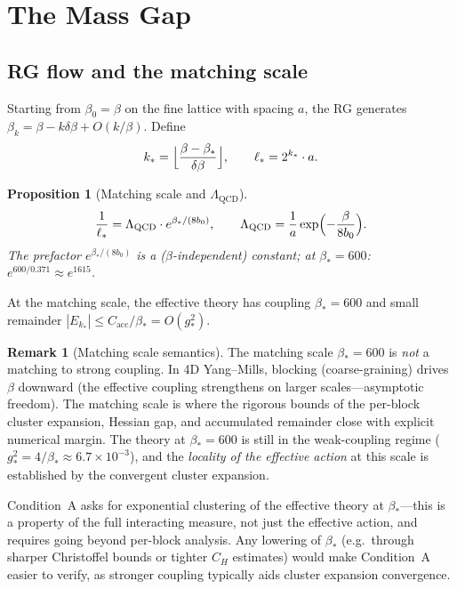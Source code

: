 \documentclass[11pt]{article}
\newtheorem{proposition}[theorem]{Proposition}
\theoremstyle{definition}
\newtheorem{remark}[theorem]{Remark}
\newcommand{\Lam}{\Lambda_{\mathrm{QCD}}}
\begin{document}
\section{The Mass Gap}\label{sec:massgap}

\subsection{RG flow and the matching scale}

Starting from $\beta_0=\beta$ on the fine lattice with spacing $a$,
the RG generates $\beta_k=\beta-k\delta\beta+O(k/\beta)$.  Define
\begin{equation}
k_*=\Bigl\lfloor\frac{\beta-\beta_*}{\delta\beta}\Bigr\rfloor,
\qquad\ell_*=2^{k_*}\cdot a.
\end{equation}

\begin{proposition}[Matching scale and $\Lam$]\label{prop:matching}
\begin{equation}\label{eq:matching}
\frac{1}{\ell_*}=\Lam\cdot e^{\beta_*/(8b_0)},
\qquad\Lam=\frac{1}{a}\exp\Bigl(-\frac{\beta}{8b_0}\Bigr).
\end{equation}
The prefactor $e^{\beta_*/(8b_0)}$ is a ($\beta$-independent)
constant; at $\beta_*=600$: $e^{600/0.371}\approx e^{1615}$.
\end{proposition}

At the matching scale, the effective theory has coupling $\beta_*=600$
and small remainder $|E_{k_*}|\le C_{\mathrm{acc}}/\beta_*
=O(g_*^2)$.

\begin{remark}[Matching scale semantics]\label{rem:matching-semantics}
The matching scale $\beta_*=600$ is \emph{not} a matching
to strong coupling.  In 4D Yang--Mills, blocking (coarse-graining)
drives $\beta$ downward (the effective coupling strengthens on
larger scales---asymptotic freedom).  The matching scale is
where the rigorous bounds of the per-block cluster expansion,
Hessian gap, and accumulated remainder close with explicit
numerical margin.
The theory at $\beta_*=600$ is still in the weak-coupling
regime ($g_*^2=4/\beta_*\approx 6.7\times 10^{-3}$), and the
\emph{locality of the effective action} at this scale is established
by the convergent cluster expansion.

Condition~A asks for exponential clustering of the effective
theory at $\beta_*$---this is a property of the full interacting
measure, not just the effective action, and requires going
beyond per-block analysis.
Any lowering of $\beta_*$ (e.g.\ through sharper Christoffel
bounds or tighter $C_H$ estimates) would make Condition~A
easier to verify, as stronger coupling typically
aids cluster expansion convergence.
\end{remark}
\end{document}
